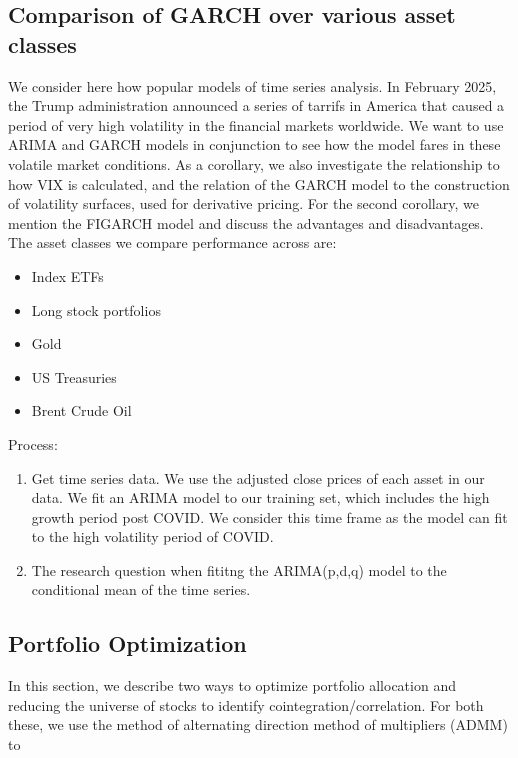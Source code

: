 \documentclass[12pt,a4paper]{cibb}
\begin{document}
\subsection{\textbf{Comparison of GARCH over various asset classes}}
We consider here how popular models of time series analysis. In February 2025, the Trump administration announced a series of tarrifs in America that caused a period of very high volatility in the financial markets worldwide. We want to use ARIMA and GARCH models in conjunction to see how the model fares in these volatile market conditions. As a corollary, we also investigate the relationship to how VIX is calculated, and the relation of the GARCH model to the construction of volatility surfaces, used for derivative pricing. For the second corollary, we mention the FIGARCH model and discuss the advantages and disadvantages. \\
The asset classes we compare performance across are: 
\begin{itemize} 
    \itemsep 1px
    \item Index ETFs
    \item Long stock portfolios
    \item Gold
    \item US Treasuries
    \item Brent Crude Oil 
\end{itemize}

Process:   \\ 
\begin{enumerate}
    \item Get time series data. We use the adjusted close prices of each asset in our data. We fit an ARIMA model to our training set, which includes the high growth period post COVID. We consider this time frame as the model can fit to the high volatility period of COVID.
    \item The research question when fititng the ARIMA(p,d,q) model to the conditional mean of the time series. 
    
\end{enumerate}

\subsection{Portfolio Optimization}
In this section, we describe two ways to optimize portfolio allocation and reducing the universe of stocks to identify cointegration/correlation. For both these, we use the method of alternating direction method of multipliers (ADMM) to 
\end{document}
